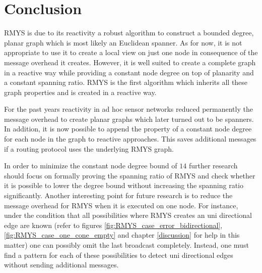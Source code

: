 \section{Conclusion}
RMYS is due to its reactivity a robust algorithm to construct a bounded degree, planar graph which is most likely an Euclidean spanner.
As for now, it is not appropriate to use it to create a local view on just one node in consequence of the message overhead it creates.
However, it is well suited to create a complete graph in a reactive way while providing a constant node degree on top of planarity and a constant spanning ratio.
RMYS is the first algorithm which inherits all these graph properties and is created in a reactive way.

For the past years reactivity in ad hoc sensor networks reduced permanently the message overhead to create planar graphs which later turned out to be spanners.
In addition, it is now possible to append the property of a constant node degree for each node in the graph to reactive approaches.
This saves additional messages if a routing protocol uses the underlying RMYS graph.

In order to minimize the constant node degree bound of $14 $ further research should focus on formally proving the spanning ratio of RMYS and check whether it is possible to lower the degree bound without increasing the spanning ratio significantly.
Another interesting point for future research is to reduce the message overhead for RMYS when it is executed on one node.
For instance, under the condition that all possibilities where RMYS creates an uni directional edge are known (refer to figures \ref{fig:RMYS_case_error_bidirectional}, \ref{fig:RMYS_case_one_cone_empty} and chapter \ref{discussion} for help in this matter) one can possibly omit the last broadcast completely.
Instead, one must find a pattern for each of these possibilities to detect uni directional edges without sending additional messages.